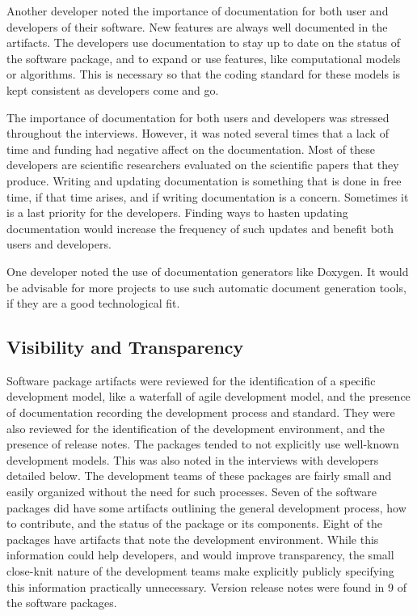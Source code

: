 \documentclass[12pt, notitlepage]{article}
\begin{document}
Another developer noted the importance of documentation for both user and developers of their software. New features are always well documented in the artifacts. The developers use documentation to stay up to date on the status of the software package, and to expand or use features, like computational models or algorithms. This is necessary so that the coding standard for these models is kept consistent as developers come and go.

The importance of documentation for both users and developers was stressed throughout the interviews. However, it was noted several times that a lack of time and funding had negative affect on the documentation. Most of these developers are scientific researchers evaluated on the scientific papers that they produce. Writing and updating documentation is something that is done in free time, if that time arises, and if writing documentation is a concern. Sometimes it is a last priority for the developers. Finding ways to hasten updating documentation would increase the frequency of such updates and benefit both users and developers. 

One developer noted the use of documentation generators like Doxygen. It would be advisable for more projects to use such automatic document generation tools, if they are a good technological fit.  

\subsection{Visibility and Transparency}

Software package artifacts were reviewed for the identification of a specific development model, like a waterfall of agile development model, and the presence of documentation recording the development process and standard. They were also reviewed for the identification of the development environment, and the presence of release notes. The packages tended to not explicitly use well-known development models. This was also noted in the interviews with developers detailed below. The development teams of these packages are fairly small and easily organized without the need for such processes. Seven of the software packages did have some artifacts outlining the general development process, how to contribute, and the status of the package or its components. Eight of the packages have artifacts that note the development environment. While this information could help developers, and would improve transparency, the small close-knit nature of the development teams make explicitly publicly specifying this information practically unnecessary. Version release notes were found in 9 of the software packages.
\end{document}
